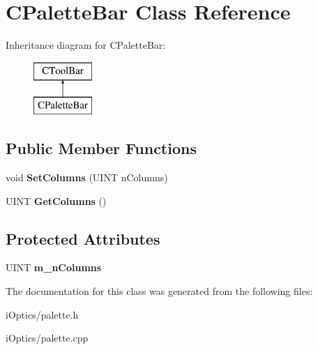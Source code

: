 \hypertarget{class_c_palette_bar}{}\section{C\+Palette\+Bar Class Reference}
\label{class_c_palette_bar}
Inheritance diagram for C\+Palette\+Bar\+:\begin{figure}[H]
\begin{center}
\leavevmode
\includegraphics[height=2.000000cm]{class_c_palette_bar}
\end{center}
\end{figure}
\subsection*{Public Member Functions}
\begin{DoxyCompactItemize}
\item 
\mbox{\label{class_c_palette_bar_aaf4c9748f0ed14e27c7d297501b58a6e}} 
void {\bfseries Set\+Columns} (U\+I\+NT n\+Columns)
\item 
\mbox{\label{class_c_palette_bar_a3640a2a9326b4924506593412c2e4dad}} 
U\+I\+NT {\bfseries Get\+Columns} ()
\end{DoxyCompactItemize}
\subsection*{Protected Attributes}
\begin{DoxyCompactItemize}
\item 
\mbox{\label{class_c_palette_bar_a1e1370ae0bdfb486d4a2284023f27d03}} 
U\+I\+NT {\bfseries m\+\_\+n\+Columns}
\end{DoxyCompactItemize}


The documentation for this class was generated from the following files\+:\begin{DoxyCompactItemize}
\item 
i\+Optics/palette.\+h\item 
i\+Optics/palette.\+cpp\end{DoxyCompactItemize}
